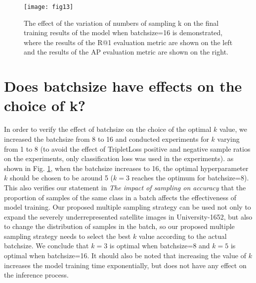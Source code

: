 \documentclass[lettersize,journal]{IEEEtran}
\begin{document}
{\begin{figure}[!t]
\centering
\texttt{[image: fig13]}
\caption{The effect of the variation of numbers of sampling k on the final training results of the model when batchsize=16 is demonstrated, where the results of the R@1 evaluation metric are shown on the left and the results of the AP evaluation metric are shown on the right.}
\label{fig_13}
\end{figure}

\section{Does batchsize have effects on the choice of k?}
In order to verify the effect of batchsize on the choice of the optimal $k$ value, we increased the batchsize from 8 to 16 and conducted experiments for $k$ varying from 1 to 8 (to avoid the effect of TripletLoss positive and negative sample ratios on the experiments, only classification loss was used in the experiments). as shown in Fig. \ref{fig_13}, when the batchsize increases to 16, the optimal hyperparameter $k$ should be chosen to be around 5 ($k=3$ reaches the optimum for batchsize=8). This also verifies our statement in \emph{The impact of sampling on accuracy} that the proportion of samples of the same class in a batch affects the effectiveness of model training. Our proposed multiple sampling strategy can be used not only to expand the severely underrepresented satellite images in University-1652, but also to change the distribution of samples in the batch, so our proposed multiple sampling strategy needs to select the best $k$ value according to the actual batchsize. We conclude that $k=3$ is optimal when batchsize=8 and $k=5$ is optimal when batchsize=16. It should also be noted that increasing the value of $k$ increases the model training time exponentially, but does not have any effect on the inference process.
}





\end{document}
